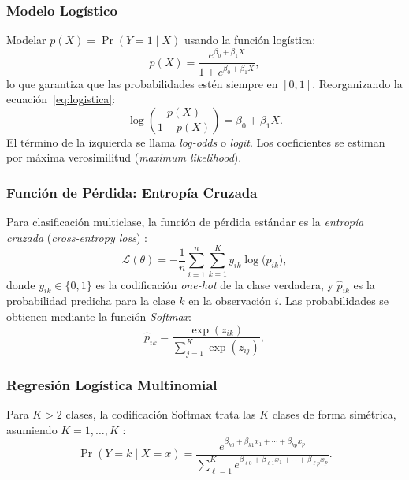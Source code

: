 \documentclass[12pt, a4paper]{article}
\newcommand{\Loss}{\mathcal{L}}
\begin{document}
\subsubsection{Modelo Logístico}

Modelar $p(X) = \Pr(Y = 1 \mid X)$ usando la función logística:
\begin{equation}
  p(X) = \frac{e^{\beta_0 + \beta_1 X}}{1 + e^{\beta_0 + \beta_1 X}},
  \label{eq:logistica}
\end{equation}
lo que garantiza que las probabilidades estén siempre en $[0,1]$.
Reorganizando la ecuación~\eqref{eq:logistica}:
\begin{equation}
  \log\!\left(\frac{p(X)}{1-p(X)}\right) = \beta_0 + \beta_1 X.
  \label{eq:logodds}
\end{equation}
El término de la izquierda se llama \textit{log-odds} o
\textit{logit}. Los coeficientes se estiman por
máxima verosimilitud (\textit{maximum likelihood}).

\subsubsection{Función de Pérdida: Entropía Cruzada}

Para clasificación multiclase, la función de pérdida estándar es la
\textit{entropía cruzada} (\textit{cross-entropy loss})
\citep[Cap.~4]{islp2023}:
\begin{equation}
  \Loss(\theta) = -\frac{1}{n} \sum_{i=1}^{n} \sum_{k=1}^{K}
  y_{ik} \log\bigl(\hat{p}_{ik}\bigr),
  \label{eq:cross_entropy}
\end{equation}
donde $y_{ik} \in \{0,1\}$ es la codificación \textit{one-hot} de la
clase verdadera, y $\hat{p}_{ik}$ es la probabilidad predicha para la
clase $k$ en la observación $i$. Las probabilidades se obtienen
mediante la función \textit{Softmax}:
\begin{equation}
  \hat{p}_{ik} = \frac{\exp(z_{ik})}{\displaystyle\sum_{j=1}^{K} \exp(z_{ij})},
  \label{eq:softmax}
\end{equation}

\subsubsection{Regresión Logística Multinomial}

Para $K > 2$ clases, la codificación Softmax trata las $K$ clases de
forma simétrica, asumiendo $K = 1, \ldots, K$
\citep[Sec.~4.3]{islp2023}:
\begin{equation}
  \Pr(Y = k \mid X = x) =
  \frac{e^{\beta_{k0} + \beta_{k1}x_1 + \cdots + \beta_{kp}x_p}}
       {\displaystyle\sum_{\ell=1}^{K}
        e^{\beta_{\ell 0} + \beta_{\ell 1}x_1 + \cdots + \beta_{\ell p}x_p}}.
  \label{eq:softmax_multinomial}
\end{equation}
\end{document}
